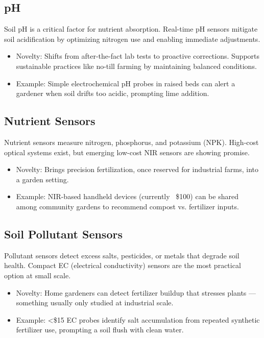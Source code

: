 \documentclass{sigchi}
\begin{document}
\subsection{pH}
Soil pH is a critical factor for nutrient absorption. Real-time pH sensors mitigate soil acidification by optimizing nitrogen use and enabling immediate adjustments.
\begin{itemize}
	\item Novelty: Shifts from after-the-fact lab tests to proactive corrections. Supports sustainable practices like no-till farming by maintaining balanced conditions.
	\item Example: Simple electrochemical pH probes in raised beds can alert a gardener when soil drifts too acidic, prompting lime addition.
\end{itemize}

\subsection{Nutrient Sensors}
Nutrient sensors measure nitrogen, phosphorus, and potassium (NPK). High-cost optical systems exist, but emerging low-cost NIR sensors are showing promise.
\begin{itemize}
	\item Novelty: Brings precision fertilization, once reserved for industrial farms, into a garden setting.  
	\item Example: NIR-based handheld devices (currently ~\$100) can be shared among community gardens to recommend compost vs. fertilizer inputs.
\end{itemize}

\subsection{Soil Pollutant Sensors}
Pollutant sensors detect excess salts, pesticides, or metals that degrade soil health. Compact EC (electrical conductivity) sensors are the most practical option at small scale.
\begin{itemize}
	\item Novelty: Home gardeners can detect fertilizer buildup that stresses plants — something usually only studied at industrial scale.
	\item Example: <\$15 EC probes identify salt accumulation from repeated synthetic fertilizer use, prompting a soil flush with clean water.
\end{itemize}
\end{document}
